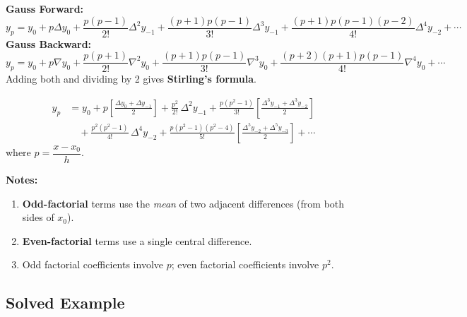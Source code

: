 \documentclass[12pt]{article}
\begin{document}
\begin{derivbox}
\textbf{Gauss Forward:}
\[
  y_p = y_0 + p\Delta y_0 + \frac{p(p-1)}{2!}\Delta^2 y_{-1}
  + \frac{(p+1)p(p-1)}{3!}\Delta^3 y_{-1}
  + \frac{(p+1)p(p-1)(p-2)}{4!}\Delta^4 y_{-2} + \cdots
\]
\textbf{Gauss Backward:}
\[
  y_p = y_0 + p\nabla y_0 + \frac{p(p+1)}{2!}\nabla^2 y_0
  + \frac{(p+1)p(p-1)}{3!}\nabla^3 y_0
  + \frac{(p+2)(p+1)p(p-1)}{4!}\nabla^4 y_0 + \cdots
\]
Adding both and dividing by 2 gives \textbf{Stirling's formula}.
\end{derivbox}

\begin{thmbox}
\begin{align*}
  y_p &= y_0
  + p\!\left[\frac{\Delta y_0 + \Delta y_{-1}}{2}\right]
  + \frac{p^2}{2!}\,\Delta^2 y_{-1}
  + \frac{p(p^2-1)}{3!}\!\left[\frac{\Delta^3 y_{-1}+\Delta^3 y_{-2}}{2}\right]\\[6pt]
  &\quad + \frac{p^2(p^2-1)}{4!}\,\Delta^4 y_{-2}
  + \frac{p(p^2-1)(p^2-4)}{5!}\!\left[\frac{\Delta^5 y_{-2}+\Delta^5 y_{-3}}{2}\right]
  + \cdots
\end{align*}
where $p = \dfrac{x - x_0}{h}$.
\end{thmbox}

\begin{keybox}
\textbf{Notes:}
\begin{enumerate}[leftmargin=*, itemsep=2pt]
  \item \textbf{Odd-factorial} terms use the \emph{mean} of two adjacent differences (from both sides of $x_0$).
  \item \textbf{Even-factorial} terms use a single central difference.
  \item Odd factorial coefficients involve $p$;\; even factorial coefficients involve $p^2$.
\end{enumerate}
\end{keybox}

\subsection*{Solved Example}
\end{document}
